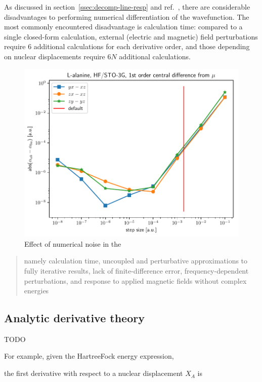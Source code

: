 \documentclass[%
class = book,%
crop = false,%
float = true,%
multi = true,%
preview = false,%
]{standalone}
\newcommand\hf{Hartree\textendash{}Fock\xspace}%
\begin{document}
As discussed in section~\ref{ssec:decomp-line-resp} and ref.~\parencite{gauss2000}, there are considerable disadvantages to performing numerical differentiation of the wavefunction. The most commonly encountered disadvantage is calculation time: compared to a single closed-form calculation, external (electric and magnetic) field perturbations require 6 additional calculations for each derivative order, and those depending on nuclear displacements require \(6N\) additional calculations.

\begin{figure}
  \centering
  \includegraphics{./diff.pdf}
  \caption{Effect of numerical noise in the}
\end{figure}

\begin{quote}
  namely calculation time, uncoupled and perturbative approximations to fully iterative results, lack of finite-difference error, frequency-dependent perturbations, and response to applied magnetic fields without complex energies
\end{quote}

\subsection{Analytic derivative theory}
\label{ssec:analytic-derivative-theory}

TODO

For example, given the \hf energy expression,

the first derivative with respect to a nuclear displacement \(X_{A}\) is
\end{document}

